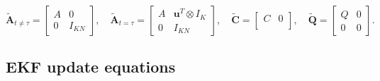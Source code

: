 \documentclass[11pt,letterpaper]{article} %
\begin{document}
\[
\widetilde{\bm{A}}_{t \not= \tau} = \begin{bmatrix}
    A & 0 \\
    0 & I_{KN}
\end{bmatrix},
\quad
\widetilde{\bm{A}}_{t = \tau} = \begin{bmatrix}
    A & \bm{u}^T \otimes I_K \\
    0 & I_{KN}
\end{bmatrix},
\quad
\widetilde{\bm{C}} = \begin{bmatrix}
    C & 0 \\
\end{bmatrix},
\quad
\widetilde{\bm{Q}} = \begin{bmatrix}
    Q & 0 \\
    0 & 0 
\end{bmatrix}.
\]

\subsection*{EKF update equations}
\end{document}
